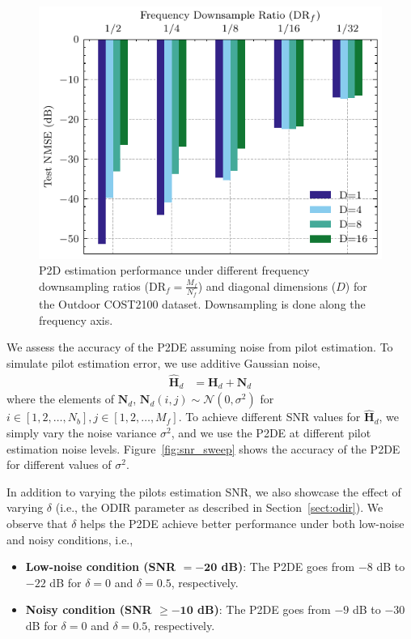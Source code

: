  \begin{figure}[!hbtp]
    \centering
    \includegraphics{./images/outdoor_p2d_diag.pdf}
    \caption{P2D estimation performance under different frequency downsampling ratios ($\text{DR}_f=\frac{M_f}{N_f}$) and diagonal dimensions ($D$) for the Outdoor COST2100 dataset. Downsampling is done along the frequency axis.}
    \label{fig:outdoor_p2d_init}
\end{figure}

We assess the accuracy of the P2DE assuming noise from pilot estimation. To simulate pilot estimation error, we use additive Gaussian noise,
\begin{align*}
    \hat{\mathbf{H}}_d &= \mathbf{H}_d + \mathbf{N}_d
\end{align*}
where the elements of $\mathbf{N}_d$, $\mathbf{N}_d(i,j) \sim \mathcal{N}(0, \sigma^2)$ for $i \in \left[1,2,\dots, N_b\right], j \in \left[1,2,\dots, M_f\right]$. To achieve different SNR values for $\hat{\mathbf{H}}_d$, we simply vary the noise variance $\sigma^2$, and we use the P2DE at different pilot estimation noise levels. Figure~\ref{fig:snr_sweep} shows the accuracy of the P2DE for different values of $\sigma^2$.

In addition to varying the pilots estimation SNR, we also showcase the effect of varying $\delta$ (i.e., the ODIR parameter as described in Section~\ref{sect:odir}). We observe that $\delta$ helps the P2DE achieve better performance under both low-noise and noisy conditions, i.e.,

\begin{itemize}
    \item \textbf{Low-noise condition (SNR $\mathbf{=-20}$ dB)}: The P2DE goes from $-8$ dB to $-22$ dB for $\delta=0$ and $\delta=0.5$, respectively.
    \item \textbf{Noisy condition (SNR $\mathbf{\geq -10}$ dB)}: The P2DE goes from $-9$ dB to $-30$ dB for $\delta=0$ and $\delta=0.5$, respectively.
\end{itemize}

